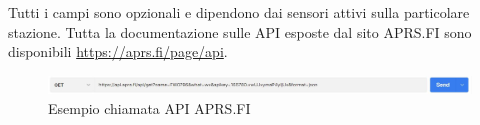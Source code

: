 Tutti i campi sono opzionali e dipendono dai sensori attivi sulla particolare stazione. Tutta la documentazione sulle API esposte dal sito APRS.FI sono disponibili \url{https://aprs.fi/page/api}.

\begin{figure}[h!]
	\centering
	\includegraphics[width=1\linewidth]{./Iterazione 3/ImageFiles/APIAPRSRequest}
	
	\caption{Esempio chiamata API APRS.FI}
	\label{fig:APIAPRS}
\end{figure}


